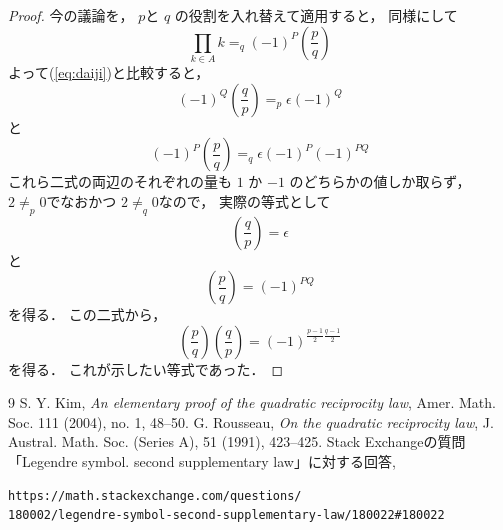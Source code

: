 \documentclass[leqno, 12pt]{jsarticle}
\newcommand{\leg}[2]{\left(\frac{#1}{#2}\right)}
\begin{document}
\begin{proof}
今の議論を，
$p$と
$q$
の役割を入れ替えて適用すると，
同様にして
\[
\prod_{k\in A}k=_q(-1)^P\leg{p}{q}
\]
よって(\ref{eq:daiji})と比較すると，
\[
(-1)^Q\leg{q}{p}=_p\epsilon(-1)^{Q}
\]
と
\[
(-1)^P\leg{p}{q}=_q\epsilon(-1)^P(-1)^{PQ}
\]
これら二式の両辺のそれぞれの量も
$1$
か
$-1$
のどちらかの値しか取らず，
$2\neq_p0$でなおかつ
 $2\neq_q0$なので，
 実際の等式として
 \[
 \leg{q}{p}=\epsilon
 \]
 と
 \[
 \leg{p}{q}=(-1)^{PQ}
 \]
 を得る．
 この二式から，
 \[
 \leg{p}{q}\leg{q}{p}=(-1)^{\frac{p-1}{2}\frac{q-1}{2}}
 \]
 を得る．
 これが示したい等式であった．
\end{proof}





	
\begin{thebibliography}{9}
S. Y. Kim, \textit{An elementary proof of the quadratic reciprocity law}, 
Amer. Math. Soc. 111 (2004), no. 1, 48--50. 
G. Rousseau, \textit{On the quadratic reciprocity law}, 
J. Austral. Math. Soc. (Series A), 51 (1991), 423--425. 
Stack Exchangeの質問「Legendre symbol. second supplementary law」に対する回答, 
\begin{verbatim}https://math.stackexchange.com/questions/
180002/legendre-symbol-second-supplementary-law/180022#180022
\end{verbatim}
\end{thebibliography}




			
\end{document}
